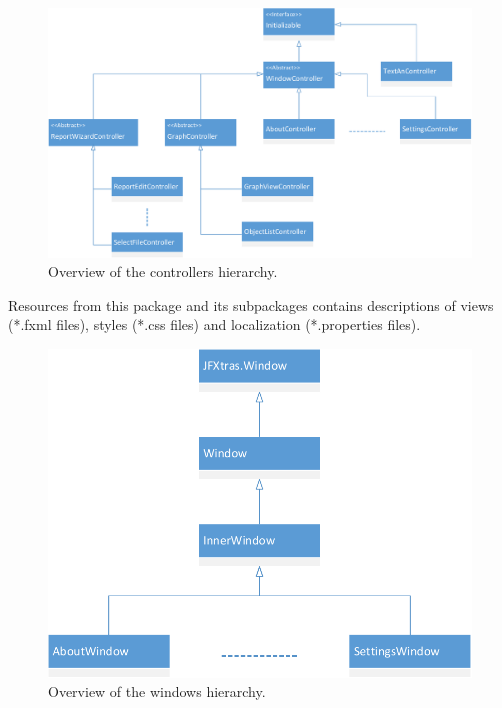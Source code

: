 \begin{figure}[!htb]
        \centering
        \includegraphics[width=\textwidth]{Images/Controllers}
        \caption{Overview of the controllers hierarchy.}
        \label{fig:Controllers}
\end{figure}

Resources from this package and its subpackages contains descriptions of views
(*.fxml files), styles (*.css files) and localization (*.properties files).

\begin{figure}[!htb]
        \centering
        \includegraphics[width=\textwidth]{Images/Windows}
        \caption{Overview of the windows hierarchy.}
        \label{fig:Windows}
\end{figure}


